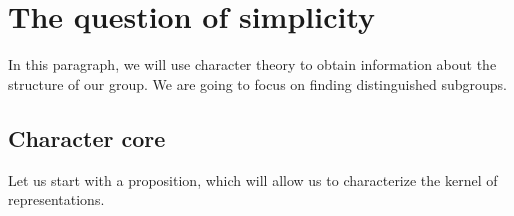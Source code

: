 \section{The question of simplicity}
 
  In this paragraph, we will use character theory to obtain information about the structure of our group. We are going to focus on finding distinguished subgroups.
\subsection{Character core}
 
  Let us start with a proposition, which will allow us to characterize the kernel of representations.
 
